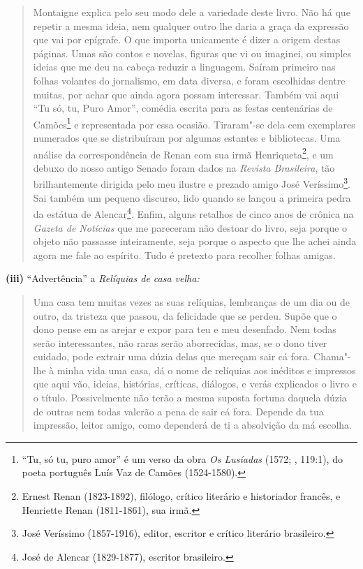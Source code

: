 \begin{quote}
Montaigne explica pelo seu modo dele a variedade deste livro. Não há que
repetir a mesma ideia, nem qualquer outro lhe daria a graça da expressão
que vai por epígrafe. O que importa unicamente é dizer a origem destas
páginas. Umas são contos e novelas, figuras que vi ou imaginei, ou
simples ideias que me deu na cabeça reduzir a linguagem. Saíram primeiro
nas folhas volantes do jornalismo, em data diversa, e foram escolhidas
dentre muitas, por achar que ainda agora possam interessar. Também vai
aqui ``Tu só, tu, Puro Amor'', comédia escrita para as festas
centenárias de Camões\footnote{``Tu, só tu, puro amor'' é um verso da
  obra \emph{Os Lusíadas} (1572; , 119:1), do poeta português Luís
  Vaz de Camões (1524-1580).} e representada por essa ocasião.
Tiraram"-se dela cem exemplares numerados que se distribuíram por algumas
estantes e bibliotecas. Uma análise da correspondência de Renan com sua
irmã Henriqueta\footnote{Ernest Renan (1823-1892), filólogo, crítico
  literário e historiador francês, e Henriette Renan (1811-1861), sua
  irmã.}, e um debuxo do nosso antigo Senado foram dados na
\emph{Revista Brasileira}, tão brilhantemente dirigida pelo meu ilustre
e prezado amigo José Veríssimo\footnote{José Veríssimo (1857-1916),
  editor, escritor e crítico literário brasileiro.}. Sai também um
pequeno discurso, lido quando se lançou a primeira pedra da estátua de
Alencar\footnote{José de Alencar (1829-1877), escritor brasileiro.}.
Enfim, alguns retalhos de cinco anos de crônica na \emph{Gazeta de
Notícias} que me pareceram não destoar do livro, seja porque o objeto
não passasse inteiramente, seja porque o aspecto que lhe achei ainda
agora me fale ao espírito. Tudo é pretexto para recolher folhas amigas.
\end{quote}

\textbf{(iii)} ``Advertência'' a \emph{Relíquias de casa velha: }

\begin{quote}
Uma casa tem muitas vezes as suas relíquias, lembranças de um dia ou de
outro, da tristeza que passou, da felicidade que se perdeu. Supõe que o
dono pense em as arejar e expor para teu e meu desenfado. Nem todas
serão interessantes, não raras serão aborrecidas, mas, se o dono tiver
cuidado, pode extrair uma dúzia delas que mereçam sair cá fora.
Chama"-lhe à minha vida uma casa, dá o nome de relíquias aos inéditos e
impressos que aqui vão, ideias, histórias, críticas, diálogos, e verás
explicados o livro e o título. Possivelmente não terão a mesma suposta
fortuna daquela dúzia de outras nem todas valerão a pena de sair cá
fora. Depende da tua impressão, leitor amigo, como dependerá de ti a
absolvição da má escolha.
\end{quote}